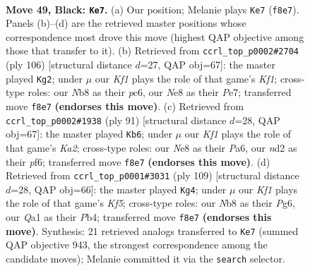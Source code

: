\documentclass[11pt]{article}
\begin{document}
\clearpage

\begin{figure}[p]\centering
\begin{subfigure}{0.46\textwidth}\centering
\resizebox{\linewidth}{!}{%
\newchessgame
\chessboard[
  setfen={1n2nk2/8/7p/p4Q2/P7/7K/3N4/q7 b - - 0 49},
  showmover=false,
  pgfstyle=straightmove, color=movearrow, markmove={f8-e7}
]}
\caption{}
\end{subfigure}\hfill
\begin{subfigure}{0.46\textwidth}\centering
\resizebox{\linewidth}{!}{%
\newchessgame
\chessboard[
  setfen={6k1/4P3/2p4Q/6p1/2q3P1/8/8/5K2 w - - 7 54},
  showmover=false,
  pgfstyle=straightmove, color=movearrow, markmove={f1-g2}
]}
\caption{}
\end{subfigure}
\\[4pt]
\begin{subfigure}{0.46\textwidth}\centering
\resizebox{\linewidth}{!}{%
\newchessgame
\chessboard[
  setfen={8/k2Q4/p4P2/1pp5/8/1K2P3/8/6q1 b - - 1 46},
  showmover=false,
  pgfstyle=straightmove, color=movearrow, markmove={a7-b6}
]}
\caption{}
\end{subfigure}\hfill
\begin{subfigure}{0.46\textwidth}\centering
\resizebox{\linewidth}{!}{%
\newchessgame
\chessboard[
  setfen={8/2Q5/6p1/8/1pK1Pk2/8/8/7q b - - 1 55},
  showmover=false,
  pgfstyle=straightmove, color=movearrow, markmove={f4-g4}
]}
\caption{}
\end{subfigure}
\caption{\textbf{Move 49, Black: \texttt{Ke7}.} (a) Our position; Melanie plays \texttt{Ke7} (\texttt{f8e7}). Panels (b)--(d) are the retrieved master positions whose correspondence most drove this move (highest QAP objective among those that transfer to it). (b) Retrieved from \texttt{ccrl\_top\_p0002\#2704} (ply 106) [structural distance $d$=27, QAP obj=67]: the master played \texttt{Kg2}; under $\mu$ our \emph{Kf1} plays the role of that game's \emph{Kf1}; cross-type roles: our \emph{N}b8 as their \emph{p}c6, our \emph{N}e8 as their \emph{P}e7; transferred move \texttt{f8e7} \textbf{(endorses this move)}. (c) Retrieved from \texttt{ccrl\_top\_p0002\#1938} (ply 91) [structural distance $d$=28, QAP obj=67]: the master played \texttt{Kb6}; under $\mu$ our \emph{Kf1} plays the role of that game's \emph{Ka2}; cross-type roles: our \emph{N}e8 as their \emph{P}a6, our \emph{n}d2 as their \emph{p}f6; transferred move \texttt{f8e7} \textbf{(endorses this move)}. (d) Retrieved from \texttt{ccrl\_top\_p0001\#3031} (ply 109) [structural distance $d$=28, QAP obj=66]: the master played \texttt{Kg4}; under $\mu$ our \emph{Kf1} plays the role of that game's \emph{Kf5}; cross-type roles: our \emph{N}b8 as their \emph{P}g6, our \emph{Q}a1 as their \emph{P}b4; transferred move \texttt{f8e7} \textbf{(endorses this move)}. Synthesis: 21 retrieved analogs transferred to \texttt{Ke7} (summed QAP objective 943, the strongest correspondence among the candidate moves); Melanie committed it via the \texttt{search} selector.}
\label{fig:thought-m97}
\end{figure}
\end{document}
